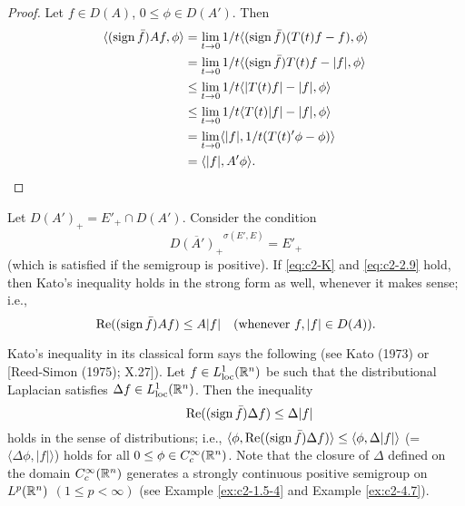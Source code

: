 \begin{proof}
Let $f \in D(A)$, $0 \leq \phi \in D(A')$.
Then
\begin{align*}
\langle(\operatorname{sign} \bar{f})Af, \phi \rangle &= \lim_{t \to 0} 1/t \langle(\operatorname{sign} \bar{f})(T(t)f - f), \phi \rangle \\
&= \lim_{t \to 0} 1/t \langle(\operatorname{sign} \bar{f})T(t)f - |f|, \phi \rangle \\
&\leq \lim_{t \to 0} 1/t \langle |T(t)f| - |f|, \phi \rangle \\
&\leq \lim_{t \to 0} 1/t \langle T(t)|f| - |f|, \phi \rangle\\
&= \lim_{t \to 0} \langle |f|, 1/t(T(t)'\phi - \phi) \rangle\\
&= \langle |f|, A'\phi \rangle.
\end{align*}
\end{proof}

Let $D(A')_{+} = E'_{+} \cap D(A')$. 
Consider the condition
\begin{equation}\label{eq:c2-2.9}
\overline{D(A')_{+}}^{\sigma(E',E)} = E'_{+}
\end{equation}
(which is satisfied if the semigroup is positive). 
If \eqref{eq:c2-K}   and \eqref{eq:c2-2.9}   hold, then Kato's inequality holds in the strong form as well, whenever it makes sense; i.e.,
\begin{equation}\label{eq:c2-2.10}
\mathop{}\!\mathrm{Re}((\operatorname{sign} \bar{f})Af) \leq A|f| \quad \text{(whenever } f, |f| \in D(A)\text{)}.
\end{equation}

\begin{example}\label{ex:c2-2.5}
Kato's inequality in its classical form says the following (see Kato (1973) or [Reed-Simon (1975); X.27]).
Let $f \in L^1_{\text{loc}}(\mathbb{R}^n)$ be such that the distributional Laplacian satisfies $\Delta f \in L^1_{\text{loc}}(\mathbb{R}^n)$.
Then the inequality
\begin{equation*} \label{eq:c2-K-classic} \tag*{}
\mathop{}\!\mathrm{Re}((\operatorname{sign} \bar{f})\Delta f) \leq \Delta|f| 
\end{equation*}
holds in the sense of distributions; i.e.,
$\langle \phi, \mathop{}\!\mathrm{Re}((\operatorname{sign} \bar{f})\Delta f) \rangle \leq \langle \phi,\Delta|f| \rangle$ (= $\langle \Delta \phi,|f| \rangle$) holds for all $0 \leq \phi \in C_{c}^{\infty}(\mathbb{R}^n)$.
Note that the closure of $\Delta$ defined on the domain $C_{c}^{\infty}(\mathbb{R}^n)$ generates a strongly continuous positive semigroup on $L^p(\mathbb{R}^n)$ $(1 \leq p < \infty)$ (see Example \ref{ex:c2-1.5-4} and Example \ref{ex:c2-4.7}).
\end{example}


